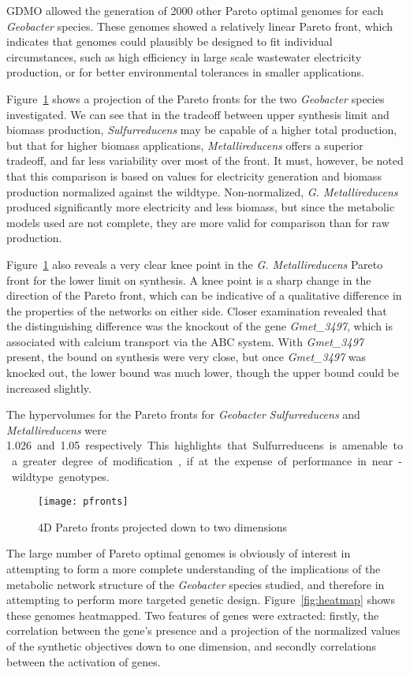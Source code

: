 \documentclass[a4paper,twocolumn]{article}
\begin{document}
GDMO allowed the generation of 2000 other Pareto optimal genomes for each {\it Geobacter} species. These genomes showed a relatively linear Pareto front, which indicates that genomes could plausibly be designed to fit individual circumstances, such as high efficiency in large scale wastewater electricity production, or for better environmental tolerances in smaller applications.

Figure~\ref{fig:pfronts} shows a projection of the Pareto fronts for the two {\it Geobacter} species investigated. We can see that in the tradeoff between upper synthesis limit and biomass production, {\it Sulfurreducens} may be capable of a higher total production, but that for higher biomass applications, {\it Metallireducens }offers a superior tradeoff, and far less variability over most of the front. It must, however, be noted that this comparison is based on values for electricity generation and biomass production normalized against the wildtype. Non-normalized, {\it G. Metallireducens} produced significantly more electricity and less biomass, but since the metabolic models used are not complete, they are more valid for comparison than for raw production.

Figure~\ref{fig:pfronts} also reveals a very clear knee point in the {\it G. Metallireducens} Pareto front for the lower limit on synthesis. A knee point is a sharp change in the direction of the Pareto front, which can be indicative of a qualitative difference in the properties of the networks on either side. Closer examination revealed that the distinguishing difference was the knockout of the gene {\it Gmet\_3497}, which is associated with calcium transport via the ABC system. With {\it Gmet\_3497} present, the bound on synthesis were very close, but once {\it Gmet\_3497} was knocked out, the lower bound was much lower, though the upper bound could be increased slightly.

The hypervolumes for the Pareto fronts for {\it Geobacter} {\it Sulfurreducens} and {\it Metallireducens} were \SI{1.026} and \SI{1.05} respectively. This highlights that Sulfurreducens is amenable to a greater degree of modification, if at the expense of performance in near-wildtype genotypes.

\begin{figure}[!htb]
\texttt{[image: pfronts]}
\caption{4D Pareto fronts projected down to two dimensions}
\label{fig:pfronts}
\end{figure}

The large number of Pareto optimal genomes is obviously of interest in attempting to form a more complete understanding of the implications of the metabolic network structure of the {\it Geobacter} species studied, and therefore in attempting to perform more targeted genetic design. Figure~\ref{fig:heatmap} shows these genomes heatmapped. Two features of genes were extracted: firstly, the correlation between the gene’s presence and a projection of the normalized values of the synthetic objectives down to one dimension, and secondly correlations between the activation of genes. 
\end{document}
